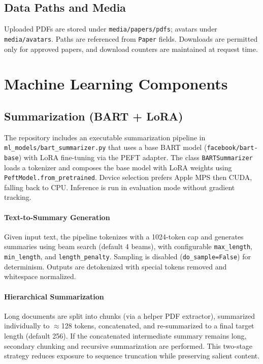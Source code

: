 \documentclass[conference]{IEEEtran}
\begin{document}
\subsection{Data Paths and Media}
Uploaded PDFs are stored under \texttt{media/papers/pdfs}; avatars under \texttt{media/avatars}. Paths are referenced from \texttt{Paper} fields. Downloads are permitted only for approved papers, and download counters are maintained at request time.

\section{Machine Learning Components}
\subsection{Summarization (BART + LoRA)}
The repository includes an executable summarization pipeline in \texttt{ml\_models/bart\_summarizer.py} that uses a base BART model (\texttt{facebook/bart-base}) with LoRA fine-tuning via the PEFT adapter. The class \texttt{BARTSummarizer} loads a tokenizer and composes the base model with LoRA weights using \texttt{PeftModel.from\_pretrained}. Device selection prefers Apple MPS then CUDA, falling back to CPU. Inference is run in evaluation mode without gradient tracking.

\paragraph*{Text-to-Summary Generation}
Given input text, the pipeline tokenizes with a 1024-token cap and generates summaries using beam search (default 4 beams), with configurable \texttt{max\_length}, \texttt{min\_length}, and \texttt{length\_penalty}. Sampling is disabled (\texttt{do\_sample=False}) for determinism. Outputs are detokenized with special tokens removed and whitespace normalized.

\paragraph*{Hierarchical Summarization}
Long documents are split into chunks (via a helper PDF extractor), summarized individually to \(\approx\)128 tokens, concatenated, and re-summarized to a final target length (default 256). If the concatenated intermediate summary remains long, secondary chunking and recursive summarization are performed. This two-stage strategy reduces exposure to sequence truncation while preserving salient content.
\end{document}
